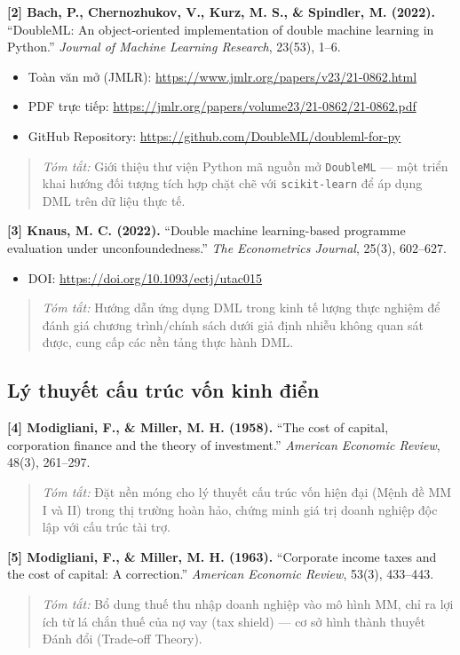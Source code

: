\documentclass[12pt,a4paper]{article}
\begin{document}
\noindent\textbf{[2] Bach, P., Chernozhukov, V., Kurz, M. S., \& Spindler, M. (2022).} ``DoubleML: An object-oriented implementation of double machine learning in Python.'' \textit{Journal of Machine Learning Research}, 23(53), 1--6.
\begin{itemize}
    \item Toàn văn mở (JMLR): \url{https://www.jmlr.org/papers/v23/21-0862.html}
    \item PDF trực tiếp: \url{https://jmlr.org/papers/volume23/21-0862/21-0862.pdf}
    \item GitHub Repository: \url{https://github.com/DoubleML/doubleml-for-py}
\end{itemize}
\begin{quote}
\textit{Tóm tắt:} Giới thiệu thư viện Python mã nguồn mở \texttt{DoubleML} --- một triển khai hướng đối tượng tích hợp chặt chẽ với \texttt{scikit-learn} để áp dụng DML trên dữ liệu thực tế.
\end{quote}

\noindent\textbf{[3] Knaus, M. C. (2022).} ``Double machine learning-based programme evaluation under unconfoundedness.'' \textit{The Econometrics Journal}, 25(3), 602--627.
\begin{itemize}
    \item DOI: \url{https://doi.org/10.1093/ectj/utac015}
\end{itemize}
\begin{quote}
\textit{Tóm tắt:} Hướng dẫn ứng dụng DML trong kinh tế lượng thực nghiệm để đánh giá chương trình/chính sách dưới giả định nhiễu không quan sát được, cung cấp các nền tảng thực hành DML.
\end{quote}

\subsection*{Lý thuyết cấu trúc vốn kinh điển}

\noindent\textbf{[4] Modigliani, F., \& Miller, M. H. (1958).} ``The cost of capital, corporation finance and the theory of investment.'' \textit{American Economic Review}, 48(3), 261--297.
\begin{quote}
\textit{Tóm tắt:} Đặt nền móng cho lý thuyết cấu trúc vốn hiện đại (Mệnh đề MM I và II) trong thị trường hoàn hảo, chứng minh giá trị doanh nghiệp độc lập với cấu trúc tài trợ.
\end{quote}

\noindent\textbf{[5] Modigliani, F., \& Miller, M. H. (1963).} ``Corporate income taxes and the cost of capital: A correction.'' \textit{American Economic Review}, 53(3), 433--443.
\begin{quote}
\textit{Tóm tắt:} Bổ dung thuế thu nhập doanh nghiệp vào mô hình MM, chỉ ra lợi ích từ lá chắn thuế của nợ vay (tax shield) --- cơ sở hình thành thuyết Đánh đổi (Trade-off Theory).
\end{quote}
\end{document}
